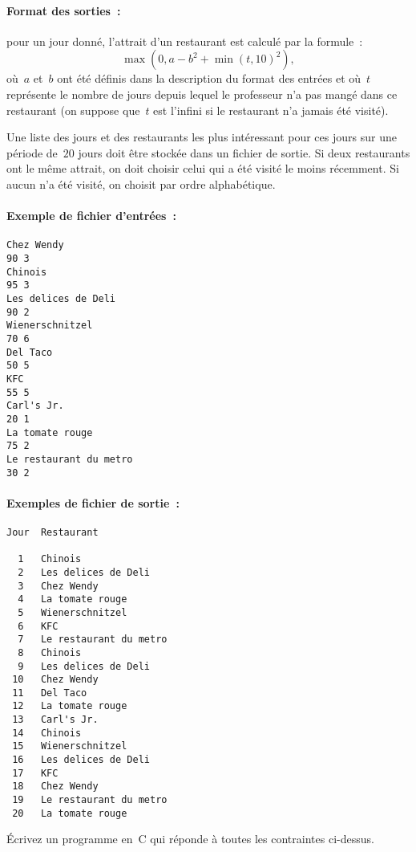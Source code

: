 \paragraph{Format des sorties~:}
 pour un jour donn\'e, l'attrait d'un restaurant est calcul\'e par la formule~:
$$
\max(0,a-b^{2}+\min(t,10)^{2}),
$$
o\`u~$a$ et~$b$ ont \'et\'e d\'efinis dans la description du format
des  entr\'ees  et  o\`u~$t$ repr\'esente   le  nombre de jours depuis
lequel le professeur n'a pas mang\'e dans ce restaurant (on suppose que~$t$ est l'infini si le restaurant n'a jamais \'et\'e visit\'e).
\par
Une liste des jours et des restaurants les plus int\'eressant pour ces
jours sur  une p\'eriode  de~$20$ jours  doit \^etre  stock\'ee  dans un
fichier de sortie. Si deux restaurants ont le m\^eme attrait, on doit choisir celui qui a \'et\'e visit\'e le moins r\'ecemment. Si aucun n'a \'et\'e visit\'e, on choisit par ordre alphab\'etique.
\paragraph{Exemple de fichier d'entr\'ees~:}
\begin{verbatim}
Chez Wendy
90 3
Chinois
95 3
Les delices de Deli
90 2
Wienerschnitzel
70 6
Del Taco
50 5
KFC
55 5
Carl's Jr.
20 1
La tomate rouge
75 2
Le restaurant du metro
30 2
\end{verbatim}
\paragraph{Exemples de fichier de sortie~:}
\begin{verbatim}
Jour  Restaurant

  1   Chinois
  2   Les delices de Deli
  3   Chez Wendy
  4   La tomate rouge
  5   Wienerschnitzel
  6   KFC
  7   Le restaurant du metro
  8   Chinois
  9   Les delices de Deli
 10   Chez Wendy
 11   Del Taco
 12   La tomate rouge
 13   Carl's Jr.
 14   Chinois
 15   Wienerschnitzel
 16   Les delices de Deli
 17   KFC
 18   Chez Wendy
 19   Le restaurant du metro
 20   La tomate rouge
\end{verbatim}
\'Ecrivez un programme en~C  qui r\'eponde \`a toutes les  contraintes
ci-dessus.
